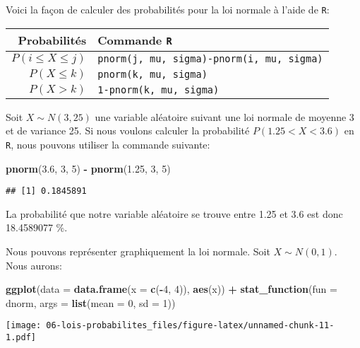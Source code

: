 \documentclass[]{book}
\newenvironment{Shaded}{\begin{snugshade}}{\end{snugshade}}
\newcommand{\KeywordTok}[1]{\textcolor[rgb]{0.13,0.29,0.53}{\textbf{#1}}}
\newcommand{\DataTypeTok}[1]{\textcolor[rgb]{0.13,0.29,0.53}{#1}}
\newcommand{\DecValTok}[1]{\textcolor[rgb]{0.00,0.00,0.81}{#1}}
\newcommand{\FloatTok}[1]{\textcolor[rgb]{0.00,0.00,0.81}{#1}}
\newcommand{\StringTok}[1]{\textcolor[rgb]{0.31,0.60,0.02}{#1}}
\newcommand{\OperatorTok}[1]{\textcolor[rgb]{0.81,0.36,0.00}{\textbf{#1}}}
\newcommand{\NormalTok}[1]{#1}
\begin{document}
Voici la façon de calculer des probabilités pour la loi normale à l'aide
de \texttt{R}:

\begin{longtable}[]{@{}rl@{}}
\toprule
Probabilités & Commande \texttt{R}\tabularnewline
\midrule
\endhead
\(P(i\leq X \leq j)\) &
\texttt{pnorm(j,\ mu,\ sigma)-pnorm(i,\ mu,\ sigma)}\tabularnewline
\(P(X\leq k)\) & \texttt{pnorm(k,\ mu,\ sigma)}\tabularnewline
\(P(X>k)\) & \texttt{1-pnorm(k,\ mu,\ sigma)}\tabularnewline
\bottomrule
\end{longtable}

Soit \(X\sim N(3,25)\) une variable aléatoire suivant une loi normale de
moyenne 3 et de variance 25. Si nous voulons calculer la probabilité
\(P(1.25<X<3.6)\) en \texttt{R}, nous pouvons utiliser la commande
suivante:

\begin{Shaded}
\begin{Highlighting}[]
\KeywordTok{pnorm}\NormalTok{(}\FloatTok{3.6}\NormalTok{, }\DecValTok{3}\NormalTok{, }\DecValTok{5}\NormalTok{) }\OperatorTok{-}\StringTok{ }\KeywordTok{pnorm}\NormalTok{(}\FloatTok{1.25}\NormalTok{, }\DecValTok{3}\NormalTok{, }\DecValTok{5}\NormalTok{)}
\end{Highlighting}
\end{Shaded}

\begin{verbatim}
## [1] 0.1845891
\end{verbatim}

La probabilité que notre variable aléatoire se trouve entre 1.25 et 3.6
est donc 18.4589077 \%.

Nous pouvons représenter graphiquement la loi normale. Soit
\(X\sim N(0,1)\). Nous aurons:

\begin{Shaded}
\begin{Highlighting}[]
\KeywordTok{ggplot}\NormalTok{(}\DataTypeTok{data =} \KeywordTok{data.frame}\NormalTok{(}\DataTypeTok{x =} \KeywordTok{c}\NormalTok{(}\OperatorTok{-}\DecValTok{4}\NormalTok{, }\DecValTok{4}\NormalTok{)), }\KeywordTok{aes}\NormalTok{(x)) }\OperatorTok{+}
\StringTok{  }\KeywordTok{stat_function}\NormalTok{(}\DataTypeTok{fun =}\NormalTok{ dnorm, }\DataTypeTok{args =} \KeywordTok{list}\NormalTok{(}\DataTypeTok{mean =} \DecValTok{0}\NormalTok{, }\DataTypeTok{sd =} \DecValTok{1}\NormalTok{))}
\end{Highlighting}
\end{Shaded}

\texttt{[image: 06-lois-probabilites\_files/figure-latex/unnamed-chunk-11-1.pdf]}
\end{document}
